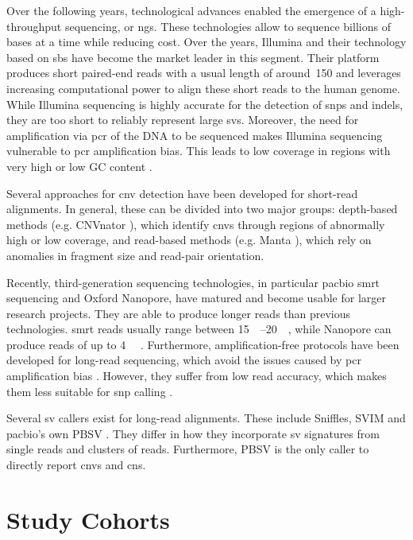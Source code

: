 \documentclass[twoside=false]{scrbook}
\begin{document}
Over the following years, technological advances enabled the emergence of a high-throughput sequencing, or \gls{ngs}.
These technologies allow to sequence billions of bases at a time while reducing cost.
Over the years, Illumina and their technology based on \gls{sbs} have become the market leader in this segment.
Their platform produces short paired-end reads with a usual length of around \qty{150}{\base} and leverages increasing computational power to align these short reads to the human genome.
While Illumina sequencing is highly accurate for the detection of \glspl{snp} and \glspl{indel}, they are too short to reliably represent large \glspl{sv}.
Moreover, the need for amplification via \gls{pcr} of the DNA to be sequenced makes Illumina sequencing vulnerable to \gls{pcr} amplification bias.
This leads to low coverage in regions with very high or low GC content \cite{Aird2011}.

Several approaches for \gls{cnv} detection have been developed for short-read alignments.
In general, these can be divided into two major groups: depth-based methods (e.g. \textsf{CNVnator} \cite{Abyzov2011b}), which identify \glspl{cnv} through regions of abnormally high or low coverage, and read-based methods (e.g. \textsf{Manta} \cite{Chen2016a}), which rely on anomalies in fragment size and read-pair orientation.

Recently, third-generation sequencing technologies, in particular \gls{pacbio} \gls{smrt} sequencing and Oxford Nanopore, have matured and become usable for larger research projects.
They are able to produce longer reads than previous technologies.
\Gls{smrt} reads usually range between \qtyrange{15}{20}{\kilo\base}, while Nanopore can produce reads of up to \qty{4}{\mega\base} \cite{Wenger2019,Payne2019}.
Furthermore, amplification-free protocols have been developed for long-read sequencing, which avoid the issues caused by \gls{pcr} amplification bias \cite{Hoijer2018}.
However, they suffer from low read accuracy, which makes them less suitable for \gls{snp} calling \cite{Rang2018}.

Several \gls{sv} callers exist for long-read alignments.
These include \textsf{Sniffles}, \textsf{SVIM} and \gls{pacbio}'s own \textsf{PBSV} \cite{Heller2019a,Sedlazeck2018a}.
They differ in how they incorporate \gls{sv} signatures from single reads and clusters of reads.
Furthermore, \textsf{PBSV} is the only caller to directly report \glspl{cnv} and \glspl{cn}.

\section{Study Cohorts}
\end{document}
